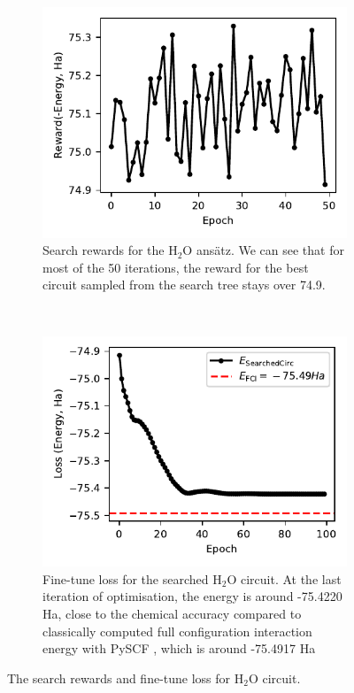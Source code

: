 \documentclass{ieeeaccess}
\begin{document}
  \begin{figure}[t!]
    \centering
    \begin{subfigure}[t]{0.48\linewidth}
        \includegraphics[width=\linewidth]{peiyong_fig_13.pdf}
        \caption{Search rewards for the $\text{H}_2\text{O}$ ans\"atz. We can see that for most of the 50 iterations, the reward for the best circuit sampled from the search tree stays over 74.9.}
        \label{fig:h2o_search}
    \end{subfigure}
    ~ %
    \begin{subfigure}[t]{0.48\linewidth}
        \includegraphics[width=\linewidth]{peiyong_fig_14.pdf}
        \caption{Fine-tune loss for the searched $\text{H}_2\text{O}$ circuit. At the last iteration of optimisation, the energy is around -75.4220  Ha,  close to the chemical accuracy compared to classically computed full configuration interaction energy with PySCF \cite{Sun2018-nq, Sun2020-ej}, which is around -75.4917  Ha}
        \label{fig:h2o_finetune}
    \end{subfigure}
    \caption{The search rewards and fine-tune loss for $\text{H}_2\text{O}$ circuit.}\label{fig:h2o_search_finetune}
\end{figure}
\end{document}
